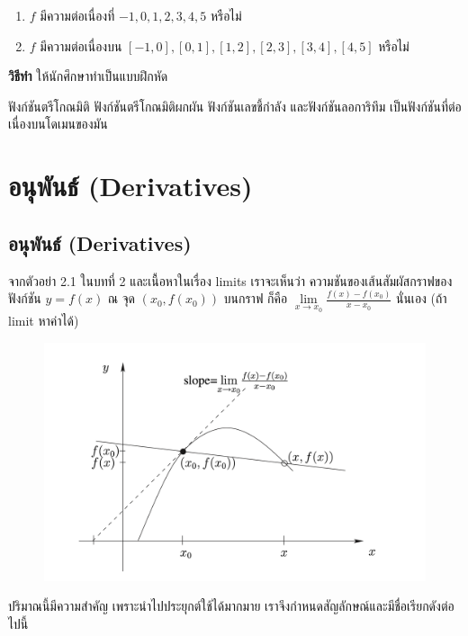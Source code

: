 \documentclass[
]{book}
\providecommand{\tightlist}{%
  \setlength{\itemsep}{0pt}\setlength{\parskip}{0pt}}
\begin{document}
\begin{enumerate}
\def\labelenumi{\arabic{enumi}.}
\tightlist
\item
  \(f\) มีความต่อเนื่องที่ \(-1,0,1,2,3,4,5\) หรือไม่\\
\item
  \(f\) มีความต่อเนื่องบน
  \(\left[ -1,0\right] ,\left[ 0,1\right] ,\left[ 1,2\right] ,\left[ 2,3\right] ,\left[ 3,4\right] ,\left[ 4,5\right]\)
  หรือไม่
\end{enumerate}

\textbf{วิธีทำ} ให้นักศึกษาทำเป็นแบบฝึกหัด

\label{thm-cont-5}
ฟังก์ชันตรีโกณมิติ ฟังก์ชันตรีโกณมิติผกผัน ฟังก์ชันเลขชี้กำลัง และฟังก์ชันลอการิทึม
เป็นฟังก์ชันที่ต่อเนื่องบนโดเมนของมัน

\chapter{อนุพันธ์
(Derivatives)}\label{uxe2duxe19uxe1euxe19uxe18-derivatives}

\section{อนุพันธ์
(Derivatives)}\label{uxe2duxe19uxe1euxe19uxe18-derivatives-1}

จากตัวอย่า 2.1 ในบทที่ 2 และเนื้อหาในเรื่อง limits เราจะเห็นว่า
ความชันของเส้นสัมผัสกราฟของฟังก์ชัน \(y=f\left( x\right)\) ณ จุด
\(\left( x_{0},f\left( x_{0}\right) \right)\) บนกราฟ ก็คือ
\(\underset{x\rightarrow x_{0}}{\lim}\frac{f\left( x\right) -f\left( x_{0}\right) }{x-x_{0}}\)
นั่นเอง (ถ้า limit หาค่าได้)

\begin{figure}

{\centering \includegraphics[width=0.5\linewidth]{images/fig-derivative-1} 

}

\end{figure}

ปริมาณนี้มีความสำคัญ เพราะนำไปประยุกต์ใช้ได้มากมาย
เราจึงกำหนดสัญลักษณ์และมีชื่อเรียกดังต่อไปนี้
\end{document}
